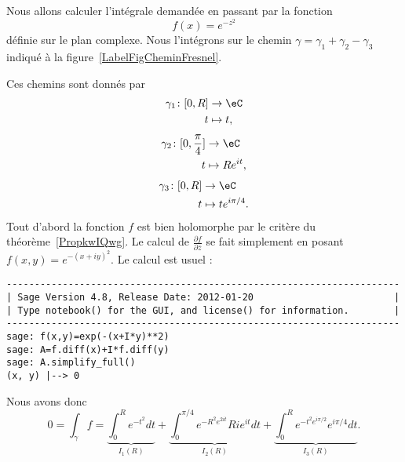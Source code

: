 Nous allons calculer l'intégrale demandée en passant par la fonction
\begin{equation}
	f(x)= e^{-z^2}
\end{equation}
définie sur le plan complexe. Nous l'intégrons sur le chemin \( \gamma=\gamma_1+\gamma_2-\gamma_3\) indiqué à la figure~\ref{LabelFigCheminFresnel}.
\newcommand{\CaptionFigCheminFresnel}{Chemin d'intégration pour l'intégrale de Fresnel}

Ces chemins sont donnés par
\begin{equation}
	\begin{aligned}
		\gamma_1\colon \mathopen[ 0 , R \mathclose] & \to \eC    \\
		t                                           & \mapsto t,
	\end{aligned}
\end{equation}
\begin{equation}
	\begin{aligned}
		\gamma_2\colon \mathopen[ 0 , \frac{ \pi }{ 4 } \mathclose] & \to \eC           \\
		t                                                           & \mapsto R e^{it},
	\end{aligned}
\end{equation}
\begin{equation}
	\begin{aligned}
		\gamma_3\colon \mathopen[ 0 , R \mathclose] & \to \eC               \\
		t                                           & \mapsto t e^{i\pi/4}.
	\end{aligned}
\end{equation}
Tout d'abord la fonction \( f\) est bien holomorphe par le critère du théorème~\ref{PropkwIQwg}. Le calcul de \( \frac{ \partial f }{ \partial \bar z }\) se fait simplement en posant \( f(x,y)= e^{-(x+iy)^2}\). Le calcul est usuel :
\begin{verbatim}
----------------------------------------------------------------------
| Sage Version 4.8, Release Date: 2012-01-20                         |
| Type notebook() for the GUI, and license() for information.        |
----------------------------------------------------------------------
sage: f(x,y)=exp(-(x+I*y)**2)
sage: A=f.diff(x)+I*f.diff(y)
sage: A.simplify_full()
(x, y) |--> 0
\end{verbatim}
Nous avons donc
\begin{equation}    \label{EqfaoRgU}
	0=\int_{\gamma}f=\underbrace{\int_0^R e^{-t^2}dt}_{I_1(R)}+\underbrace{\int_0^{\pi/4} e^{-R^2 e^{2it}}Ri e^{it}dt}_{I_2(R)}+\underbrace{\int_0^R e^{-t^2 e^{i\pi/2}} e^{i\pi/4}dt}_{I_3(R)}.
\end{equation}

